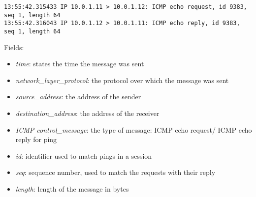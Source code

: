 \begin{lstlisting}
13:55:42.315433 IP 10.0.1.11 > 10.0.1.12: ICMP echo request, id 9383, seq 1, length 64
13:55:42.316043 IP 10.0.1.12 > 10.0.1.11: ICMP echo reply, id 9383, seq 1, length 64

\end{lstlisting}
Fields:\\
\begin{itemize}
\item \textit{time}: states the time the message was sent\\
\item \textit{network\_layer\_protocol}: the protocol over which the message was sent \\
\item \textit{source\_address}: the address of the sender\\
\item \textit{destination\_address}: the address of the receiver\\
\item \textit{ICMP control\_message}: the type of message: ICMP echo request/ ICMP echo reply for ping \\
\item \textit{id}: identifier used to match pings in a session \\
\item \textit{seq}: sequence number, used to match the requests with their reply \\
\item \textit{length}: length of the message in bytes
\end{itemize}
